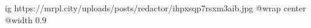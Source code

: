  
 
 
 
 

\ifcmt
  ig https://mrpl.city/uploads/posts/redactor/ihpxsqp7rsxm3aib.jpg
  @wrap center
  @width 0.9
\fi
